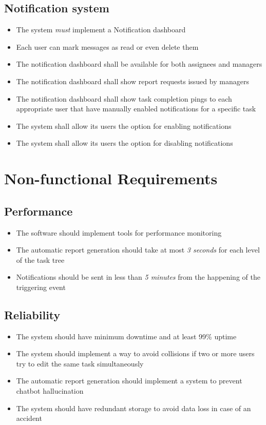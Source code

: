 \documentclass{article}
\begin{document}
\subsection{Notification system}
\begin{itemize}
    \item The system \textit{must} implement a Notification dashboard
    \item Each user can mark messages as read or even delete them
    \item The notification dashboard shall be available for both assignees and managers
    \item The notification dashboard shall show report requests issued by managers
    \item The notification dashboard shall show task completion pings to each appropriate user that have manually enabled notifications for a specific task
    \item The system shall allow its users the option for enabling notifications
    \item The system shall allow its users the option for disabling notifications
\end{itemize}

\section{Non-functional Requirements}
\subsection{Performance}
\begin{itemize}
    \item The software should implement tools for performance monitoring
    \item The automatic report generation should take at most \textit{3 seconds} for each level of the task tree
    \item Notifications should be sent in less than \textit{5 minutes} from the happening of the triggering event
\end{itemize}

\subsection{Reliability}
\begin{itemize}
    \item The system should have minimum downtime and at least 99\% uptime
    \item The system should implement a way to avoid collisions if two or more users try to edit the same task simultaneously
    \item The automatic report generation should implement a system to prevent chatbot hallucination
    \item The system should have redundant storage to avoid data loss in case of an accident
\end{itemize}
\end{document}
